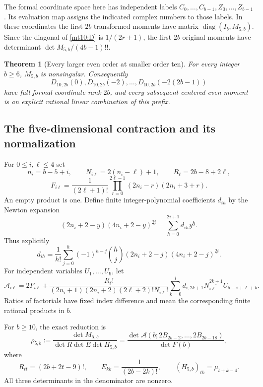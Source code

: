 \documentclass[11pt,a4paper]{article}
\numberwithin{equation}{section}
\newtheorem{theorem}{Theorem}[section]
\theoremstyle{definition}
\theoremstyle{remark}
\begin{document}
The formal coordinate space here has independent labels
$C_0,\ldots,C_{b-1},Z_0,\ldots,Z_{b-1}$. Its evaluation map assigns
the indicated complex numbers to those labels. In these coordinates
the first $2b$ transformed moments have matrix
$\operatorname{diag}(I_b,M_{5,b})$. Since the diagonal of
\eqref{mt10:D} is $1/(2r+1)$, the first $2b$ original moments have
determinant $\det M_{5,b}/(4b-1)!!$.

\begin{theorem}[Every larger even order at smaller order ten]
\label{mt10:main}
For every integer $b\ge6$, $M_{5,b}$ is nonsingular. Consequently
\[
 D_{10,2b}(0),D_{10,2b}(-2),\ldots,D_{10,2b}(-2(2b-1))
\]
have full formal coordinate rank $2b$, and every subsequent centered
even moment is an explicit rational linear combination of this prefix.
\end{theorem}

\subsection{The five-dimensional contraction and its normalization}

For $0\le i,\ell\le4$ set
\[
 n_i=b-5+i,\qquad N_{i\ell}=2(n_i-\ell)+1,
 \qquad R_\ell=2b-8+2\ell,
\]
\[
 F_{i\ell}=\frac1{(2\ell+1)!}
       \prod_{r=0}^{2\ell-1}(2n_i-r)(2n_i+3+r).
\]
An empty product is one. Define finite integer-polynomial coefficients
$d_{ih}$ by the Newton expansion
\begin{equation}\label{mt10:newton}
 (2n_i+2-y)(4n_i+2-y)^{\underline{2i}}
   =\sum_{h=0}^{2i+1}d_{ih}y^{\underline h}.
\end{equation}
Thus explicitly
\[
 d_{ih}=\frac1{h!}\sum_{j=0}^h(-1)^{h-j}\binom hj
           (2n_i+2-j)(4n_i+2-j)^{\underline{2i}}.
\]
For independent variables $U_1,\ldots,U_9$, let
\begin{equation}\label{mt10:A}
 \mathcal A_{i\ell}=2F_{i\ell}+
 \frac{R_\ell!}{(2n_i+1)(2n_i+2)(2\ell+2)!N_{i\ell}!}
 \sum_{k=0}^i d_{i,2k+1}N_{i\ell}^{\underline{2k+1}}
                      U_{5-i+\ell+k}.
\end{equation}
Ratios of factorials have fixed index difference and mean the
corresponding finite rational products in $b$.

For $b\ge10$, the exact reduction is
\begin{equation}\label{mt10:ratio}
 \rho_{5,b}:=\frac{\det M_{5,b}}{\det R\det E\det H_{5,b}}
  =\frac{\det\mathcal A(b;2B_{2b-2},\ldots,2B_{2b-18})}
         {\det F(b)},
\end{equation}
where
\[
 R_{tt}=(2b+2t-9)!,\qquad E_{kk}=\frac1{(2b-2k)!},
 \qquad (H_{5,b})_{tk}=\mu_{t+k-4}.
\]
All three determinants in the denominator are nonzero.
\end{document}
